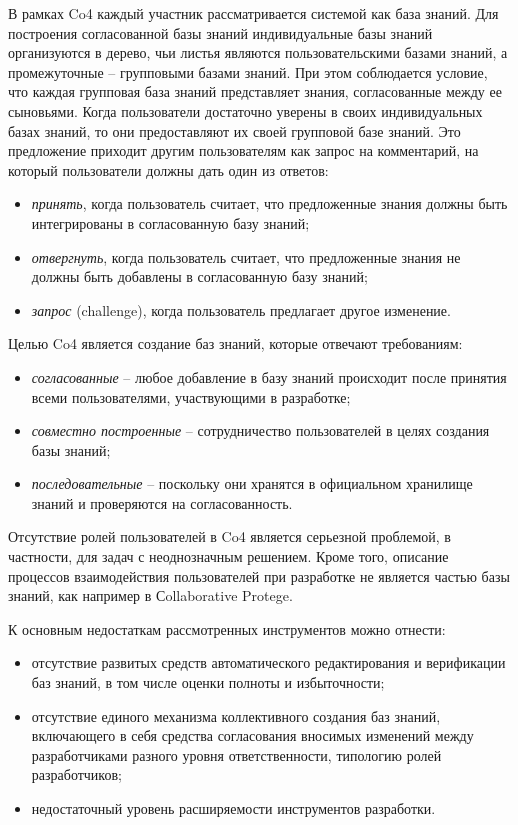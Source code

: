 В рамках Co4 каждый участник рассматривается системой как база знаний. Для построения согласованной базы знаний индивидуальные базы знаний организуются в дерево, чьи листья являются пользовательскими базами знаний, а промежуточные  -- групповыми базами знаний. При этом соблюдается условие, что каждая групповая база знаний представляет знания, согласованные между ее сыновьями. Когда пользователи достаточно уверены в своих индивидуальных базах знаний, то они предоставляют их своей групповой базе знаний. Это предложение приходит другим пользователям как запрос на комментарий, на который пользователи должны дать один из ответов:

\begin{itemize}
    \item \textit{принять}, когда пользователь считает, что предложенные знания должны быть интегрированы в согласованную базу знаний;
    \item \textit{отвергнуть}, когда пользователь считает, что предложенные знания не должны быть добавлены в согласованную базу знаний;
    \item \textit{запрос} (challenge), когда пользователь предлагает другое изменение.
\end{itemize}

Целью Co4 является создание баз знаний, которые отвечают требованиям:

\begin{itemize}
    \item \textit{согласованные} – любое добавление в базу знаний происходит после принятия всеми пользователями, участвующими в разработке;
    \item \textit{совместно построенные} – сотрудничество пользователей в целях создания базы знаний;
    \item \textit{последовательные} – поскольку они хранятся в официальном хранилище знаний и проверяются на согласованность.
\end{itemize}

Отсутствие ролей пользователей в Co4 является серьезной проблемой, в частности, для задач с неоднозначным решением. Кроме того, описание процессов взаимодействия пользователей при разработке не является частью базы знаний, как например в Сollaborative Protege.

К основным недостаткам рассмотренных инструментов можно отнести:

\begin{itemize}
    \item отсутствие развитых средств автоматического редактирования и верификации баз знаний, в том числе оценки полноты и избыточности;
    \item отсутствие единого механизма коллективного создания баз знаний, включающего в себя средства согласования вносимых изменений между разработчиками разного уровня ответственности, типологию ролей разработчиков;
    \item недостаточный уровень расширяемости инструментов разработки.
\end{itemize}


